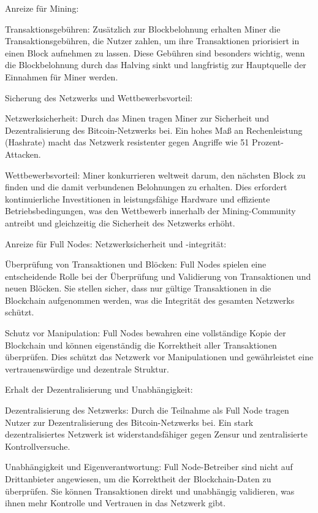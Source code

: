 \documentclass[german]{../uebung}
\begin{document}
\begin{exercise}{4}
    Anreize für Mining:

    Transaktionsgebühren: Zusätzlich zur Blockbelohnung erhalten Miner die Transaktionsgebühren, die Nutzer zahlen, um ihre Transaktionen priorisiert in einen Block aufnehmen zu lassen. Diese Gebühren sind besonders wichtig, wenn die Blockbelohnung durch das Halving sinkt und langfristig zur Hauptquelle der Einnahmen für Miner werden.

    Sicherung des Netzwerks und Wettbewerbsvorteil:

    Netzwerksicherheit: Durch das Minen tragen Miner zur Sicherheit und Dezentralisierung des Bitcoin-Netzwerks bei. Ein hohes Maß an Rechenleistung (Hashrate) macht das Netzwerk resistenter gegen Angriffe wie 51 Prozent-Attacken.

    Wettbewerbsvorteil: Miner konkurrieren weltweit darum, den nächsten Block zu finden und die damit verbundenen Belohnungen zu erhalten. Dies erfordert kontinuierliche Investitionen in leistungsfähige Hardware und effiziente Betriebsbedingungen, was den Wettbewerb innerhalb der Mining-Community antreibt und gleichzeitig die Sicherheit des Netzwerks erhöht.

    Anreize für Full Nodes:
    Netzwerksicherheit und -integrität:

    Überprüfung von Transaktionen und Blöcken: Full Nodes spielen eine entscheidende Rolle bei der Überprüfung und Validierung von Transaktionen und neuen Blöcken. Sie stellen sicher, dass nur gültige Transaktionen in die Blockchain aufgenommen werden, was die Integrität des gesamten Netzwerks schützt.

    Schutz vor Manipulation: Full Nodes bewahren eine vollständige Kopie der Blockchain und können eigenständig die Korrektheit aller Transaktionen überprüfen. Dies schützt das Netzwerk vor Manipulationen und gewährleistet eine vertrauenswürdige und dezentrale Struktur.

    Erhalt der Dezentralisierung und Unabhängigkeit:

    Dezentralisierung des Netzwerks: Durch die Teilnahme als Full Node tragen Nutzer zur Dezentralisierung des Bitcoin-Netzwerks bei. Ein stark dezentralisiertes Netzwerk ist widerstandsfähiger gegen Zensur und zentralisierte Kontrollversuche.

    Unabhängigkeit und Eigenverantwortung: Full Node-Betreiber sind nicht auf Drittanbieter angewiesen, um die Korrektheit der Blockchain-Daten zu überprüfen. Sie können Transaktionen direkt und unabhängig validieren, was ihnen mehr Kontrolle und Vertrauen in das Netzwerk gibt.
\end{exercise}
\end{document}
